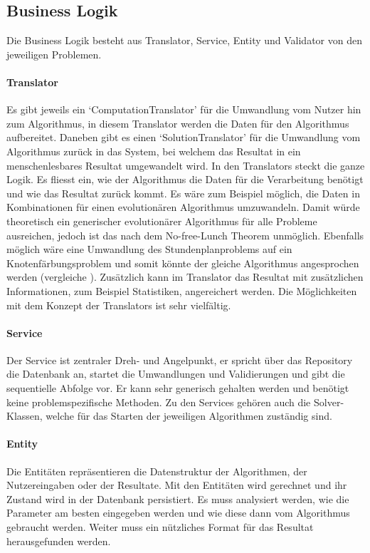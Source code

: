 \subsection{Business Logik}
Die Business Logik besteht aus Translator, Service, Entity und Validator von den jeweiligen Problemen. 
\paragraph{Translator}
Es gibt jeweils ein `ComputationTranslator' für die Umwandlung vom Nutzer hin zum Algorithmus, in diesem Translator werden die Daten für den Algorithmus aufbereitet. Daneben gibt es einen 
`SolutionTranslator' für die Umwandlung vom Algorithmus zurück in das System, bei welchem das Resultat in ein menschenlesbares Resultat umgewandelt wird. In den Translators steckt die 
ganze Logik. Es fliesst ein, wie der Algorithmus die Daten für die Verarbeitung benötigt und wie das Resultat zurück kommt. Es wäre zum Beispiel möglich, die Daten in Kombinationen für einen 
evolutionären Algorithmus umzuwandeln. Damit würde theoretisch ein generischer evolutionärer Algorithmus für alle Probleme ausreichen, jedoch ist das nach dem No-free-Lunch Theorem 
\cite{no_free_lunch} unmöglich. Ebenfalls möglich wäre eine Umwandlung des Stundenplanproblems auf ein Knotenfärbungsproblem und somit könnte der gleiche Algorithmus angesprochen 
werden (vergleiche \cite{timetabling_abdullah}).  Zusätzlich kann im Translator das Resultat mit zusätzlichen Informationen, zum Beispiel Statistiken, angereichert werden. Die Möglichkeiten mit 
dem Konzept der Translators ist sehr vielfältig.
\paragraph{Service}
Der Service ist zentraler Dreh- und Angelpunkt, er spricht über das Repository die Datenbank an, startet die Umwandlungen und Validierungen und gibt die sequentielle Abfolge vor. Er kann 
sehr generisch gehalten werden und benötigt keine problemspezifische Methoden. Zu den Services gehören auch die Solver-Klassen, welche für das Starten der jeweiligen Algorithmen zuständig 
sind.
\paragraph{Entity}
Die Entitäten repräsentieren die Datenstruktur der Algorithmen, der Nutzereingaben oder der Resultate. Mit den Entitäten wird gerechnet und ihr Zustand wird in der Datenbank persistiert. 
Es muss analysiert werden, wie die Parameter am besten eingegeben werden und wie diese dann vom Algorithmus gebraucht werden. Weiter muss ein nützliches Format für das Resultat 
herausgefunden werden.
